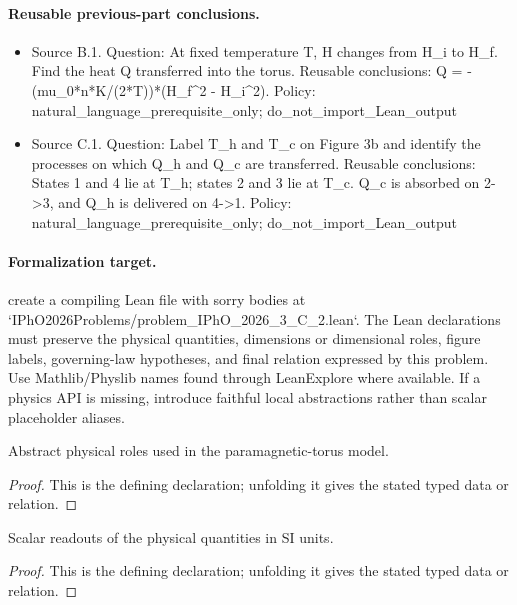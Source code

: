 \paragraph{Reusable previous-part conclusions.}
\begin{itemize}
\item Source B.1. Question: At fixed temperature T, H changes from H\_i to H\_f. Find the heat Q transferred into the torus. Reusable conclusions: Q = -(mu\_0*n*K/(2*T))*(H\_f\textasciicircum{}2 - H\_i\textasciicircum{}2). Policy: natural\_language\_prerequisite\_only; do\_not\_import\_Lean\_output
\item Source C.1. Question: Label T\_h and T\_c on Figure 3b and identify the processes on which Q\_h and Q\_c are transferred. Reusable conclusions: States 1 and 4 lie at T\_h; states 2 and 3 lie at T\_c. Q\_c is absorbed on 2->3, and Q\_h is delivered on 4->1. Policy: natural\_language\_prerequisite\_only; do\_not\_import\_Lean\_output
\end{itemize}

\paragraph{Formalization target.}
create a compiling Lean file with sorry bodies at `IPhO2026Problems/problem\_IPhO\_2026\_3\_C\_2.lean`. The Lean declarations must preserve the physical quantities, dimensions or dimensional roles, figure labels, governing-law hypotheses, and final relation expressed by this problem.
Use Mathlib/Physlib names found through LeanExplore where available. If a physics API is missing, introduce faithful local abstractions rather than scalar placeholder aliases.

\begin{definition}[PhysicalQuantityTypes]
  \label{decl:physics:IPhO_2026_3_C_2:PhysicalQuantityTypes}
  Abstract physical roles used in the paramagnetic-torus model.
\end{definition}
\begin{proof}
  This is the defining declaration; unfolding it gives the stated typed data or relation.
\end{proof}

\begin{definition}[SIReadout]
  \label{decl:physics:IPhO_2026_3_C_2:SIReadout}
  Scalar readouts of the physical quantities in SI units.
\end{definition}
\begin{proof}
  This is the defining declaration; unfolding it gives the stated typed data or relation.
\end{proof}

